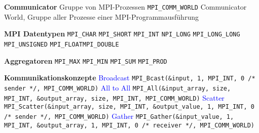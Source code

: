 \textbf{Communicator} Gruppe von MPI-Prozessen \lstinline{MPI_COMM_WORLD} Communicator World, Gruppe aller Prozesse einer MPI-Programmausführung

\textbf{MPI Datentypen} \lstinline{MPI_CHAR} \lstinline{MPI_SHORT} \lstinline{MPI_INT} \lstinline{NPI_LONG} \lstinline{MPI_LONG_LONG} \lstinline{MPI_UNSIGNED} \lstinline{MPI_FLOAT}\lstinline{MPI_DOUBLE}

\textbf{Aggregatoren} \lstinline{MPI_MAX} \lstinline{MPI_MIN} \lstinline{MPI_SUM} \lstinline{MPI_PROD}

\textbf{Kommunikationskonzepte}
\textcolor{blue}{Broadcast} \lstinline{MPI_Bcast(&input, 1, MPI_INT, 0 /* sender */, MPI_COMM_WORLD)}
\textcolor{blue}{All to All} \lstinline{MPI_All(&input_array, size, MPI_INT, &output_array, size, MPI_INT, MPI_COMM_WORLD)}
\textcolor{blue}{Scatter} \lstinline{MPI_Scatter(&input_array, size, MPI_INT, &output_value, 1, MPI_INT, 0 /* sender */, MPI_COMM_WORLD)}
\textcolor{blue}{Gather} \lstinline{MPI_Gather(&input_value, 1, MPI_INT, &output_array, 1, MPI_INT, 0 /* receiver */, MPI_COMM_WORLD)}

%
%
%
%
